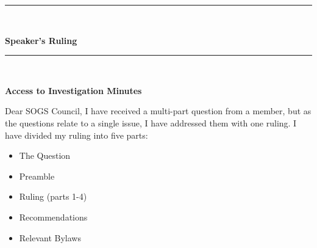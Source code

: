\setcounter{section}{0}
\begin{center}
\rule{\textwidth}{3.6pt}\\[\baselineskip] %
\begin{Huge}
\textbf{Speaker's Ruling}
\end{Huge}

\rule{\textwidth}{3.6pt}\\[\baselineskip] %



\vspace*{2\baselineskip} %

{\large  \textbf{Access to Investigation Minutes}}
\end{center}



Dear SOGS Council,
I have received a multi-part question from a member, but as the questions relate to a single issue, I have addressed them with one ruling. I have divided my ruling into five parts:
\begin{itemize}
\item The Question
\item Preamble
\item Ruling (parts 1-4)
\item Recommendations
\item Relevant Bylaws
\end{itemize}

